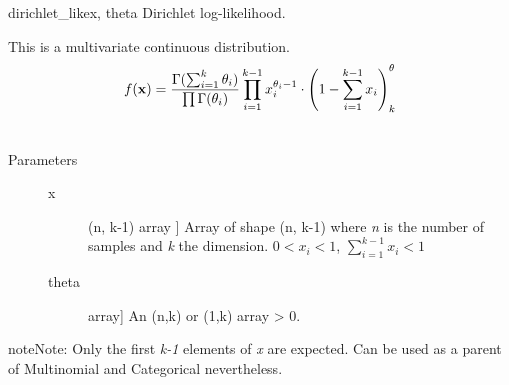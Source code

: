 \hypertarget{pymc.distributions.dirichlet_like}{}\begin{funcdesc}{dirichlet\_like}{x, theta}
Dirichlet log-likelihood.

This is a multivariate continuous distribution.
\begin{gather}
\begin{split}f(\mathbf{x}) = \frac{\Gamma(\sum_{i=1}^k \theta_i)}{\prod \Gamma(\theta_i)}\prod_{i=1}^{k-1} x_i^{\theta_i - 1}\cdot\left(1-\sum_{i=1}^{k-1}x_i\right)^\theta_k\end{split}\notag\\\begin{split}\end{split}\notag
\end{gather}\begin{description}
\item[Parameters] \leavevmode\begin{description}
\item[x] \leavevmode{[}(n, k-1) array {]}
Array of shape (n, k-1) where \emph{n} is the number of samples
and \emph{k} the dimension.
$0 < x_i < 1$,  $\sum_{i=1}^{k-1} x_i < 1$
\item[theta] \leavevmode{[}array{]}
An (n,k) or (1,k) array \textgreater{} 0.

\end{description}

\end{description}

\begin{notice}{note}{Note:}
Only the first \emph{k-1} elements of \emph{x} are expected. Can be used as a parent of Multinomial and Categorical
nevertheless.
\end{notice}
\end{funcdesc}

